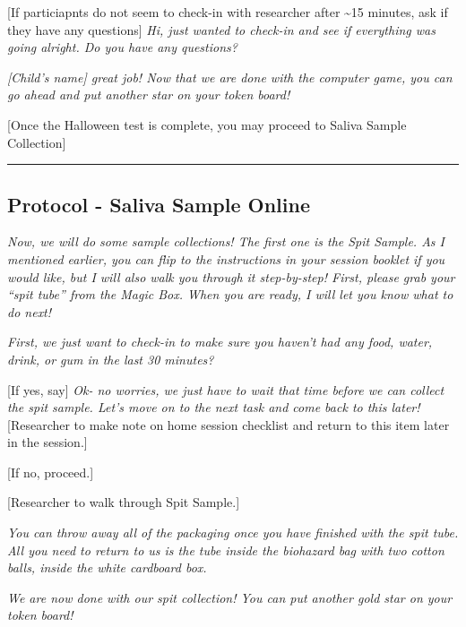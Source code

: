 \documentclass[]{book}
\begin{document}
{[}If particiapnts do not seem to check-in with researcher after \textasciitilde{}15 minutes, ask if they have any questions{]} \emph{Hi, just wanted to check-in and see if everything was going alright. Do you have any questions?}

\emph{{[}Child's name{]} great job! Now that we are done with the computer game, you can go ahead and put another star on your token board!}

{[}Once the Halloween test is complete, you may proceed to Saliva Sample Collection{]}

\begin{center}\rule{0.5\linewidth}{0.5pt}\end{center}

\hypertarget{protocol---saliva-sample-online}{%
\subsection{Protocol - Saliva Sample Online}\label{protocol---saliva-sample-online}}

\emph{Now, we will do some sample collections! The first one is the Spit Sample. As I mentioned earlier, you can flip to the instructions in your session booklet if you would like, but I will also walk you through it step-by-step! First, please grab your ``spit tube'' from the Magic Box. When you are ready, I will let you know what to do next!}

\emph{First, we just want to check-in to make sure you haven't had any food, water, drink, or gum in the last 30 minutes?}

{[}If yes, say{]} \emph{Ok- no worries, we just have to wait that time before we can collect the spit sample. Let's move on to the next task and come back to this later!} {[}Researcher to make note on home session checklist and return to this item later in the session.{]}

{[}If no, proceed.{]}

{[}Researcher to walk through Spit Sample.{]}

\emph{You can throw away all of the packaging once you have finished with the spit tube. All you need to return to us is the tube inside the biohazard bag with two cotton balls, inside the white cardboard box.}

\emph{We are now done with our spit collection! You can put another gold star on your token board!}
\end{document}
